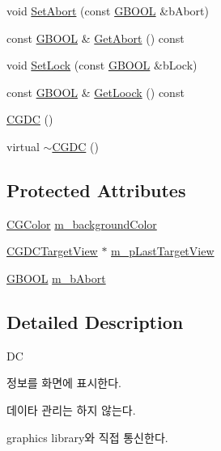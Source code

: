 \begin{DoxyCompactItemize}
void \hyperlink{class_c_g_d_c_ac59c2995cc1c4c1811956ff0548f536e}{Set\+Abort} (const \hyperlink{_g_types_8h_a2901915743626352a6820c5405f556dc}{G\+B\+O\+O\+L} \&b\+Abort)
\item 
const \hyperlink{_g_types_8h_a2901915743626352a6820c5405f556dc}{G\+B\+O\+O\+L} \& \hyperlink{class_c_g_d_c_a85b6f42d0c1727b572e173e142e1addf}{Get\+Abort} () const 
\item 
void \hyperlink{class_c_g_d_c_a6609c50a0c9a5d2d74a2c53f5d09e218}{Set\+Lock} (const \hyperlink{_g_types_8h_a2901915743626352a6820c5405f556dc}{G\+B\+O\+O\+L} \&b\+Lock)
\item 
const \hyperlink{_g_types_8h_a2901915743626352a6820c5405f556dc}{G\+B\+O\+O\+L} \& \hyperlink{class_c_g_d_c_aafb01d84f718d088bfdee02d1b471ced}{Get\+Loock} () const 
\item 
\hyperlink{class_c_g_d_c_afc5cb1b2769713ebcf19055ef55a0381}{C\+G\+D\+C} ()
\item 
virtual \hyperlink{class_c_g_d_c_acf8de0b9a51f2b8083d13e66378fe9ab}{$\sim$\+C\+G\+D\+C} ()
\end{DoxyCompactItemize}
\subsection*{Protected Attributes}
\begin{DoxyCompactItemize}
\item 
\hyperlink{class_c_g_color}{C\+G\+Color} \hyperlink{class_c_g_d_c_ab4c69c7cd04f20ffa3969ed64b11d8f3}{m\+\_\+background\+Color}
\item 
\hyperlink{class_c_g_d_c_target_view}{C\+G\+D\+C\+Target\+View} $\ast$ \hyperlink{class_c_g_d_c_afe672e18142fcbd92713e843bd13fcd1}{m\+\_\+p\+Last\+Target\+View}
\item 
\hyperlink{_g_types_8h_a2901915743626352a6820c5405f556dc}{G\+B\+O\+O\+L} \hyperlink{class_c_g_d_c_a84a2e179021ffb26c80ac82f3430e5e7}{m\+\_\+b\+Abort}
\end{DoxyCompactItemize}


\subsection{Detailed Description}

\begin{DoxyItemize}
\item D\+C
\item 정보를 화면에 표시한다.
\item 데이타 관리는 하지 않는다.
\item graphics library와 직접 통신한다. 
\end{DoxyItemize}

